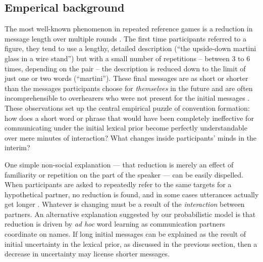 
\subsection{Emperical background}


The most well-known phenomenon in repeated reference games is a reduction in message length over multiple rounds . 
The first time participants referred to a figure, they tend to use a lengthy, detailed description (``the upside-down martini glass in a wire stand'') but with a small number of repetitions -- between 3 to 6 times, depending on the pair -- the description is reduced down to the limit of just one or two words (``martini''). 
These final messages are as short or shorter than the messages participants choose for \emph{themselves} in the future   and are often incomprehensible to overhearers who were not present for the initial messages \cite{SchoberClark89_Overhearers}.
These observations set up the central empirical puzzle of convention formation: how does a short word or phrase that would have been completely ineffective for communicating under the initial lexical prior become perfectly understandable over mere minutes of interaction? What changes inside participants' minds in the interim? 

One simple non-social explanation --- that reduction is merely an effect of familiarity or repetition on the part of the speaker --- can be easily dispelled. 
When participants are asked to repeatedly refer to the same targets for a hypothetical partner, no reduction is found, and in some cases utterances actually get longer \cite{HupetChantraine92_CollaborationOrRepitition}. 
Whatever is changing must be a result of the \emph{interaction} between partners.
An alternative explanation suggested by our probabilistic model is that reduction is driven by \emph{ad hoc} word learning as communication partners coordinate on names. 
If long initial messages can be explained as the result of initial uncertainty in the lexical prior, as discussed in the previous section, then a decrease in uncertainty may license shorter messages.

